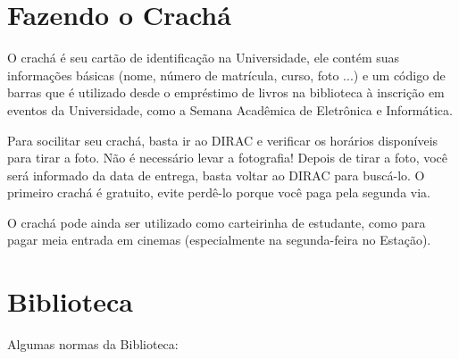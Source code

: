 \documentclass[a4paper,12pt,openany]{article}
\begin{document}
\newpage
\section{Fazendo o Crachá}

O crachá é seu cartão de identificação na Universidade, ele contém suas informações básicas (nome, número de matrícula, curso, foto ...) e um código de barras que é utilizado desde o empréstimo de livros na biblioteca à inscrição em eventos da Universidade, como a Semana Acadêmica de Eletrônica e Informática. 

Para socilitar seu crachá, basta ir ao DIRAC e verificar os horários disponíveis para tirar a foto. Não é necessário levar a fotografia! Depois de tirar a foto, você será informado da data de entrega, basta voltar ao DIRAC para buscá-lo. O primeiro crachá é gratuito, evite perdê-lo porque você paga pela segunda via.

O crachá pode ainda ser utilizado como carteirinha de estudante, como para pagar meia entrada em cinemas (especialmente na segunda-feira no Estação).


\newpage
\section{Biblioteca}

Algumas normas da Biblioteca:
\end{document}
